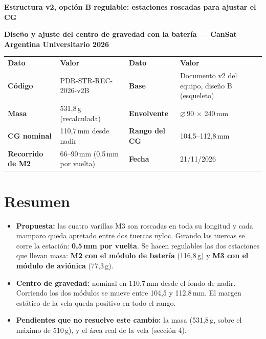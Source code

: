 \documentclass[10pt,a4paper]{article}
\newcommand{\diam}{\ensuremath{\varnothing}}
\begin{document}
\begin{tcolorbox}[colback=celeste,colframe=azul,boxrule=0.6pt,arc=0pt]
{\large\bfseries\color{azul} Estructura v2, opción B regulable: estaciones roscadas para ajustar el CG\par}\smallskip
{\bfseries Diseño y ajuste del centro de gravedad con la batería ---
CanSat Argentina Universitario 2026\par}
\end{tcolorbox}
\par{\small\noindent\begin{tabularx}{\linewidth}{P{2.8cm}LP{2.8cm}L}
\color{white}\bfseries Dato & \color{white}\bfseries Valor & \color{white}\bfseries Dato & \color{white}\bfseries Valor \\
\bfseries Código & PDR-STR-REC-2026-v2B & \bfseries Base & Documento v2 del equipo, diseño B (esqueleto) \\
\bfseries Masa & 531,8\,g (recalculada) & \bfseries Envolvente & \diam\,90 $\times$ 240\,mm \\
\bfseries CG nominal & 110,7\,mm desde nadir & \bfseries Rango del CG & 104,5--112,8\,mm \\
\bfseries Recorrido de M2 & 66--90\,mm (0,5\,mm por vuelta) & \bfseries Fecha & 21/11/2026 \\
\end{tabularx}}
\par\medskip
\section*{Resumen}
\begin{itemize}
\item \textbf{Propuesta:} las cuatro varillas M3 son roscadas en toda su longitud y cada mamparo queda apretado entre dos
tuercas nyloc. Girando las tuercas se corre la estación: \textbf{0,5\,mm por vuelta}. Se hacen regulables las dos estaciones
que llevan masa: \textbf{M2 con el módulo de batería} (116,8\,g) y \textbf{M3 con el módulo de
aviónica} (77,3\,g).
\item \textbf{Centro de gravedad:} nominal en 110,7\,mm desde el fondo de nadir. Corriendo los dos
módulos se mueve entre 104,5 y 112,8\,mm. El margen estático de la vela
queda positivo en todo el rango.
\item \textbf{Pendientes que no resuelve este cambio:} la masa (531,8\,g, sobre el máximo de 510\,g),
y el área real de la vela (sección 4).
\end{itemize}
\end{document}
